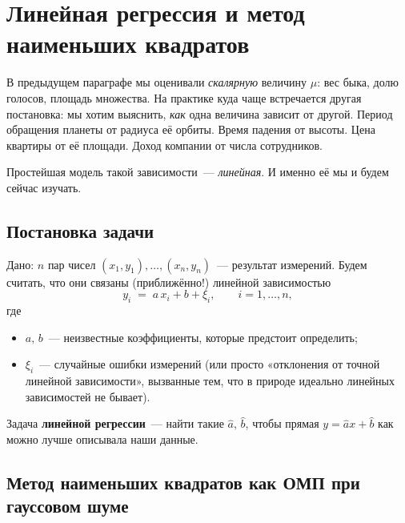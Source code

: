 \section{Линейная регрессия и метод наименьших квадратов}
\label{sec:ols}

В предыдущем параграфе мы оценивали \emph{скалярную} величину $\mu$: вес
быка, долю голосов, площадь множества. На практике куда чаще встречается
другая постановка: мы хотим выяснить, \emph{как} одна величина зависит от
другой. Период обращения планеты от радиуса её орбиты. Время падения от
высоты. Цена квартиры от её площади. Доход компании от числа
сотрудников.

Простейшая модель такой зависимости~--- \emph{линейная}. И именно
её мы и будем сейчас изучать.

\subsection{Постановка задачи}
\label{ssec:ols-setup}

Дано: $n$ пар чисел $(x_1,y_1),\dots,(x_n,y_n)$~--- результат измерений.
Будем считать, что они связаны (приближённо!) линейной зависимостью
\begin{equation}\label{eq:lin-model}
y_i\;=\;a\,x_i+b+\xi_i,\qquad i=1,\dots,n,
\end{equation}
где
\begin{itemize}\itemsep1pt
  \item $a,\,b$~--- неизвестные коэффициенты, которые предстоит определить;
  \item $\xi_i$~--- случайные ошибки измерений (или просто «отклонения
        от точной линейной зависимости», вызванные тем, что в природе
        идеально линейных зависимостей не бывает).
\end{itemize}

Задача \textbf{линейной регрессии}~--- найти такие $\hat a,\,\hat b$, чтобы
прямая $y=\hat a x+\hat b$ как можно лучше описывала наши данные.

\subsection{Метод наименьших квадратов как ОМП при гауссовом шуме}
\label{ssec:ols-as-mle}

